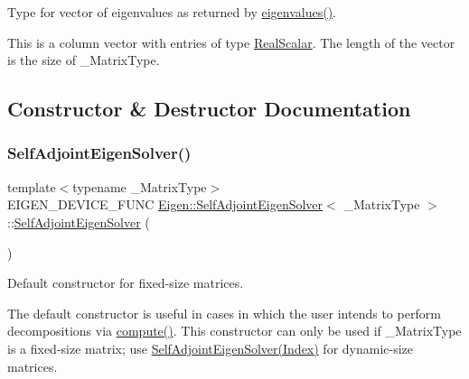 Type for vector of eigenvalues as returned by \mbox{\hyperlink{class_eigen_1_1_self_adjoint_eigen_solver_a8efab27e82aa6aa0ae0c64739238c2e0}{eigenvalues()}}. 

This is a column vector with entries of type \mbox{\hyperlink{class_eigen_1_1_self_adjoint_eigen_solver_a5dae5f422a3c71060e6bd31332bf64fd}{Real\+Scalar}}. The length of the vector is the size of {\ttfamily \+\_\+\+Matrix\+Type}. 

\subsection{Constructor \& Destructor Documentation}
\mbox{\label{class_eigen_1_1_self_adjoint_eigen_solver_af3466b3809be4a7738d84493d80d4737}} 
\subsubsection{\texorpdfstring{SelfAdjointEigenSolver()}{SelfAdjointEigenSolver()}\hspace{0.1cm}{\footnotesize\ttfamily [1/3]}}
{\footnotesize\ttfamily template$<$typename \+\_\+\+Matrix\+Type$>$ \\
E\+I\+G\+E\+N\+\_\+\+D\+E\+V\+I\+C\+E\+\_\+\+F\+U\+NC \mbox{\hyperlink{class_eigen_1_1_self_adjoint_eigen_solver}{Eigen\+::\+Self\+Adjoint\+Eigen\+Solver}}$<$ \+\_\+\+Matrix\+Type $>$\+::\mbox{\hyperlink{class_eigen_1_1_self_adjoint_eigen_solver}{Self\+Adjoint\+Eigen\+Solver}} (\begin{DoxyParamCaption}{ }\end{DoxyParamCaption})\hspace{0.3cm}{\ttfamily [inline]}}



Default constructor for fixed-\/size matrices. 

The default constructor is useful in cases in which the user intends to perform decompositions via \mbox{\hyperlink{class_eigen_1_1_self_adjoint_eigen_solver_a88bcdc24112efa7c4d2ebb3476efcbe9}{compute()}}. This constructor can only be used if {\ttfamily \+\_\+\+Matrix\+Type} is a fixed-\/size matrix; use \mbox{\hyperlink{class_eigen_1_1_self_adjoint_eigen_solver_af20f466a4c29477271e91841e3382b27}{Self\+Adjoint\+Eigen\+Solver(\+Index)}} for dynamic-\/size matrices.

